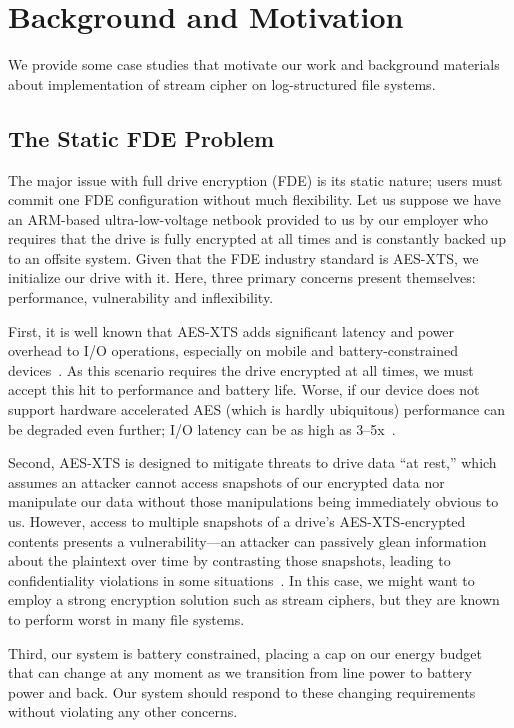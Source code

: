 \section{Background and Motivation}\label{sec:motivation}

We provide some case studies that motivate our work and background materials
about implementation of stream cipher on log-structured file systems.


\subsection{The Static FDE Problem}

The major issue with full drive encryption (FDE) is its static nature; users
must commit one FDE configuration without much flexibility. Let us suppose we
have an ARM-based ultra-low-voltage netbook provided to us by our employer who
requires that the drive is fully encrypted at all times and is constantly backed
up to an offsite system. Given that the FDE industry standard is AES-XTS, we
initialize our drive with it. Here, three primary concerns present themselves:
performance, vulnerability and inflexibility.

First, it is well known that AES-XTS adds significant latency and power overhead
to I/O operations, especially on mobile and battery-constrained
devices~\cite{google-engadget, android-M-mobile-motivation,
android-M-mobile-motivation-2}. As this scenario requires the drive encrypted at
all times, we must accept this hit to performance and battery life. Worse, if
our device does not support hardware accelerated AES (which is hardly
ubiquitous) performance can be degraded even further; I/O latency can be as high
as 3--5x~\cite{StrongBox}.

Second, AES-XTS is designed to mitigate threats to drive data ``at rest,'' which
assumes an attacker cannot access snapshots of our encrypted data nor manipulate
our data without those manipulations being immediately obvious to us. However,
access to multiple snapshots of a drive's AES-XTS-encrypted contents presents a
vulnerability---an attacker can passively glean information about the plaintext
over time by contrasting those snapshots, leading to confidentiality violations
in some situations~\cite{XEX, XTS}. In this case, we might want to employ a
strong encryption solution such as stream ciphers, but they are known to perform
worst in many file systems.

Third, our system is battery constrained, placing a cap on our energy budget
that can change at any moment as we transition from line power to battery power
and back. Our system should respond to these changing requirements without
violating any other concerns.


